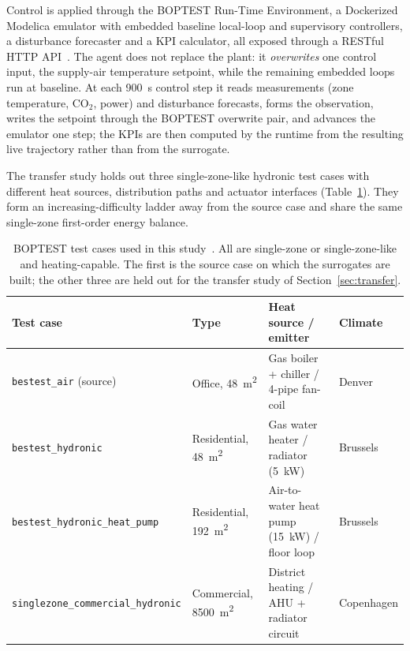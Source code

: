 Control is applied through the BOPTEST Run-Time Environment, a Dockerized Modelica emulator with
embedded baseline local-loop and supervisory controllers, a disturbance forecaster and a KPI
calculator, all exposed through a RESTful HTTP API~\cite{Arroyo2021GymBOPTEST}. The agent does not
replace the plant: it \emph{overwrites} one control input, the supply-air temperature setpoint,
while the remaining embedded loops run at baseline. At each \SI{900}{\second} control step it reads
measurements (zone temperature, CO$_2$, power) and disturbance forecasts, forms the observation,
writes the setpoint through the BOPTEST overwrite pair, and advances the emulator one step; the KPIs
are then computed by the runtime from the resulting live trajectory rather than from the surrogate.

The transfer study holds out three single-zone-like hydronic test cases with different heat sources,
distribution paths and actuator interfaces (Table~\ref{tab:testcases}). They form an
increasing-difficulty ladder away from the source case and share the same single-zone first-order
energy balance.

\begin{table}[H]
\centering
\small
\begin{tabularx}{\linewidth}{@{}llXl@{}}
\toprule
Test case & Type & Heat source / emitter & Climate \\
\midrule
\texttt{bestest\_air} (source) & Office, \SI{48}{\meter\squared} & Gas boiler + chiller / 4-pipe fan-coil & Denver \\
\texttt{bestest\_hydronic} & Residential, \SI{48}{\meter\squared} & Gas water heater / radiator (\SI{5}{\kilo\watt}) & Brussels \\
\texttt{bestest\_hydronic\_heat\_pump} & Residential, \SI{192}{\meter\squared} & Air-to-water heat pump (\SI{15}{\kilo\watt}) / floor loop & Brussels \\
\texttt{singlezone\_commercial\_hydronic} & Commercial, \SI{8500}{\meter\squared} & District heating / AHU + radiator circuit & Copenhagen \\
\bottomrule
\end{tabularx}
\caption{BOPTEST test cases used in this study~\cite{Blum2021BOPTEST}. All are single-zone or
single-zone-like and heating-capable. The first is the source case on which the surrogates are
built; the other three are held out for the transfer study of Section~\ref{sec:transfer}.}
\label{tab:testcases}
\end{table}

